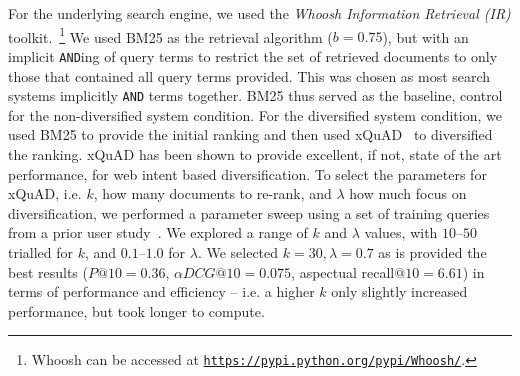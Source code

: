 
For the underlying search engine, we used the \emph{Whoosh Information Retrieval (IR)} toolkit.~\footnote{Whoosh can be accessed at \texttt{\url{https://pypi.python.org/pypi/Whoosh/}}.} We used BM25 as the retrieval algorithm ($b=0.75$), but with an implicit \texttt{AND}ing of query terms to restrict the set of retrieved documents to only those that contained all query terms provided. This was chosen as most search systems implicitly \texttt{AND} terms together. BM25 thus served as the baseline, control for the non-diversified system condition. For the diversified system condition, we used BM25 to provide the initial ranking and then used xQuAD~\cite{santos2010query_reformulations_diversification} to diversified the ranking. xQuAD has been shown to provide excellent, if not, state of the art performance, for web intent based diversification. To select the parameters for xQuAD, i.e. $k$, how many documents to re-rank, and $\lambda$ how much focus on diversification, we performed a parameter sweep using a set of training queries from a prior user study~\cite{maxwell2017snippet_length}. We explored a range of $k$ and $\lambda$ values, with $10$--$50$ trialled for $k$, and $0.1$--$1.0$ for $\lambda$. We selected $k=30, \lambda=0.7$ as is provided the best results ($P@10=0.36$, $\alpha DCG@10=0.075$, aspectual recall$@10=6.61$) in terms of performance and efficiency -- i.e. a higher $k$ only slightly increased performance, but took longer to compute.

